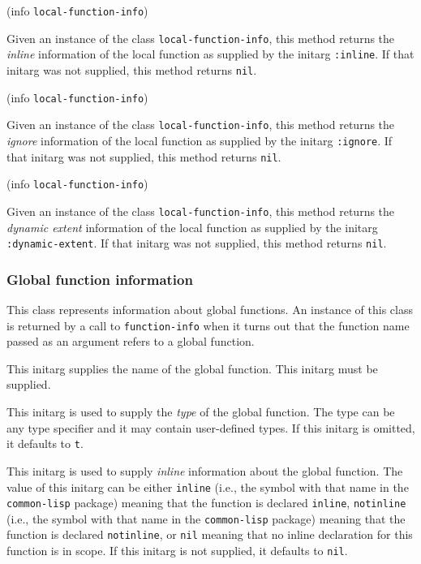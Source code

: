  {(info {\tt local-function-info})}

Given an instance of the class \texttt{local-function-info}, this
method returns the \emph{inline} information of the local function as
supplied by the initarg \texttt{:inline}.  If that initarg was not
supplied, this method returns \texttt{nil}.

 {(info {\tt local-function-info})}

Given an instance of the class \texttt{local-function-info}, this
method returns the \emph{ignore} information of the local function as
supplied by the initarg \texttt{:ignore}.  If that initarg was not
supplied, this method returns \texttt{nil}.

 {(info {\tt local-function-info})}

Given an instance of the class \texttt{local-function-info}, this
method returns the \emph{dynamic extent} information of the local
function as supplied by the initarg \texttt{:dynamic-extent}.  If that
initarg was not supplied, this method returns \texttt{nil}.

\subsubsection{Global function information}


This class represents information about global functions.  An instance
of this class is returned by a call to \texttt{function-info} when it
turns out that the function name passed as an argument refers to a
global function.


This initarg supplies the name of the global function.  This initarg
must be supplied.


This initarg is used to supply the \emph{type} of the global function.
The type can be any type specifier and it may contain user-defined
types.  If this initarg is omitted, it defaults to \texttt{t}.


This initarg is used to supply \emph{inline} information about the
global function.  The value of this initarg can be either
\texttt{inline} (i.e., the symbol with that name in the
\texttt{common-lisp} package) meaning that the function is declared
\texttt{inline}, \texttt{notinline} (i.e., the symbol with that name
in the \texttt{common-lisp} package) meaning that the function is
declared \texttt{notinline}, or \texttt{nil} meaning that no inline
declaration for this function is in scope.  If this initarg is not
supplied, it defaults to \texttt{nil}.

